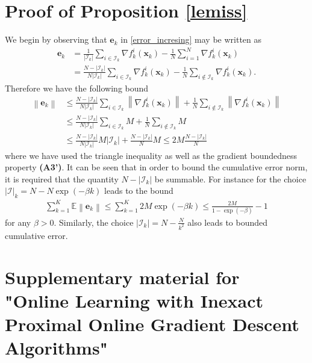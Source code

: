 \documentclass[draftcls,onecolumn,12pt]{IEEEtran}
\theoremstyle{plain}
\def\x{\mathbf{x}}
\def\e{\mathbf{e}}
\def\I{\mathcal{I}}
\def\EE{\mathbb{E}}
\providecommand{\abs}[1]{\left|#1\right|}
\providecommand{\norm}[1]{\left\|#1\right\|}
\theoremstyle{plain}
\theoremstyle{remark}
\begin{document}
\section{Proof of Proposition \ref{lemiss}}\label{proof_prop_3}
We begin by observing that $\e_k$ in \eqref{error_incresing} may be written as
\begin{align}
\e_k &= \frac{1}{\abs{\I_k}}\sum\limits_{i \in \I_k}\nabla f_k^i(\x_k)- \frac{1}{N}\sum\limits_{i=1}^{N}\nabla f_k^{i}(\x_k) \nonumber\\
&=\frac{N-\abs{\I_k}}{N\abs{\I_k}}\sum\limits_{i \in \I_k}\nabla f_k^i(\x_k)- \frac{1}{N}\sum\limits_{i\notin \I_k}\nabla f_k^{i}(\x_k).
\end{align}
Therefore we have the following bound
			\begin{align}
			\!\!\!\norm{\e_k} &\leq  \frac{N\!-\!\abs{\I_k}}{N\abs{\I_k}}\!\!\sum\limits_{i \in \I_k}\!\!\norm{\nabla f_k^i(\x_k)}+ \frac{1}{N}\sum\limits_{i\notin \I_k}\norm{\nabla f_k^{i}(\x_k)} \\
			&\leq  \frac{N-\abs{\I_k}}{N\abs{\I_k}}\sum\limits_{i \in \I_k}M+ \frac{1}{N}\sum\limits_{i\notin \I_k}M  \\
			&\leq  \frac{N-\abs{\I_k}}{N\abs{\I_k}}M\abs{\I_k}+ \frac{N-\abs{\I_k}}{N}M  \leq 2M\frac{N-\abs{\I_k}}{N} \nonumber
			\end{align}
where we have used the triangle inequality as well as the gradient boundedness property \textbf{(A3')}. It can be seen that in order to bound the cumulative error norm, it is required that the quantity $N-\abs{\I_k}$ be summable. For instance for the choice $\abs{\I}_k  = N-N\exp(-\beta k)$ leads to the bound
\begin{align}\nonumber
\sum_{k=1}^K\EE\norm{\e_k} \leq \sum_{k=1}^K 2M\exp(-\beta k) \leq \frac{2M}{1-\exp(-\beta)}-1
\end{align}
for any $\beta > 0$. Similarly, the choice $\abs{\I_k} = N-\tfrac{N}{k^2}$ also leads to bounded cumulative error. 
	

  		\vspace{-0mm}
  		
\footnotesize
 

%
\newpage\onecolumn
\section*{Supplementary material for "Online Learning with Inexact Proximal Online Gradient Descent Algorithms"}
\end{document}
